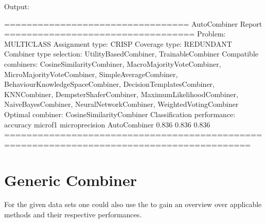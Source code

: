 \documentclass[letterpaper,10pt,english]{sphinxmanual}
\begin{document}
\sphinxAtStartPar
Output:

\begin{sphinxVerbatim}[commandchars=\\\{\}]
================================= AutoCombiner \PYGZhy{} Report ==================================
                   Problem: MULTI\PYGZus{}CLASS
           Assignment type: CRISP
             Coverage type: REDUNDANT
   Combiner type selection: UtilityBasedCombiner, TrainableCombiner
      Compatible combiners: CosineSimilarityCombiner, MacroMajorityVoteCombiner, MicroMajorityVoteCombiner, SimpleAverageCombiner, BehaviourKnowledgeSpaceCombiner, DecisionTemplatesCombiner, KNNCombiner, DempsterShaferCombiner, MaximumLikelihoodCombiner, NaiveBayesCombiner, NeuralNetworkCombiner, WeightedVotingCombiner
          Optimal combiner: CosineSimilarityCombiner
Classification performance:
                                     accuracy  micro\PYGZus{}f1  micro\PYGZus{}precision
AutoCombiner                            0.836     0.836            0.836
==========================================================================================
\end{sphinxVerbatim}


\section{Generic Combiner}
\label{\detokenize{usage_and_examples:generic-combiner}}
\sphinxAtStartPar
For the given data sets one could also use the {\hyperref[\detokenize{pusion.auto.generic_combiner:gc-cref}]{}} to gain an overview over applicable
methods and their respective performances.

\begin{sphinxVerbatim}[commandchars=\\\{\}]
  
 

  
 

\end{sphinxVerbatim}
\end{document}
